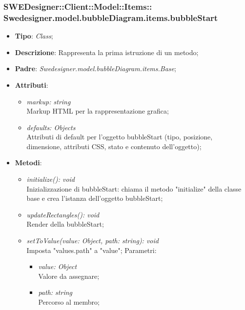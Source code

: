 \documentclass[../DefinizioneDiProdotto.tex]{subfiles}
\begin{document}
			\subsubsection[Swedesigner.model.bubbleDiagram.items.bubbleStart]{SWEDesigner::Client::Model::Items::\\Swedesigner.model.bubbleDiagram.items.bubbleStart}
			\hypertarget{SWEDesigner::Client::Model::Items::Swedesigner.model.bubbleDiagram.items.bubbleStart}{}
			\begin{itemize}
				\item \textbf{Tipo}: \emph{Class};
				\item \textbf{Descrizione}: Rappresenta la prima istruzione di un metodo;
				\item \textbf{Padre}: \emph{Swedesigner.model.bubbleDiagram.items.Base};
				\item \textbf{Attributi}:
				\begin{itemize}
					\item \emph{markup: string}\\
					Markup HTML per la rappresentazione grafica;
					\item \emph{defaults: Objects}\\
					Attributi di default per l'oggetto bubbleStart (tipo, posizione, dimensione, attributi CSS, stato e contenuto dell'oggetto);
				\end{itemize}
				\item \textbf{Metodi}:
				\begin{itemize}
					\item \emph{initialize(): void}\\
					Inizializzazione di bubbleStart: chiama il metodo "initialize" della classe base e crea l'istanza dell'oggetto bubbleStart;
					\item \emph{updateRectangles(): void}\\
					Render della bubbleStart;
					\item \emph{setToValue(value: Object, path: string): void}\\
					Imposta "values.path" a "value";
					Parametri:
					\begin{itemize}
						\item \emph{value: Object} \\
						Valore da assegnare;
						\item \emph{path: string} \\
						Percorso al membro;
					\end{itemize}
				\end{itemize}
			\end{itemize}
			
\end{document}
